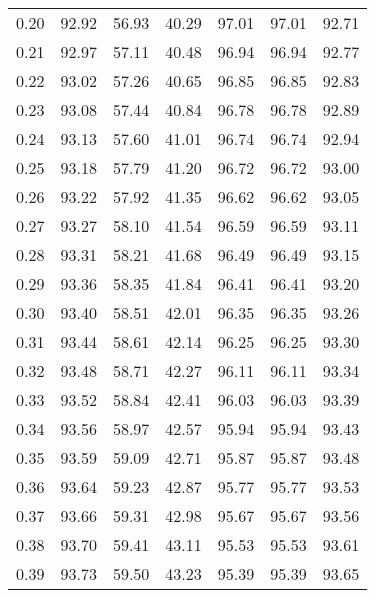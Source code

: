 \begin{tabular}{|c|c|c|c|c|c|c|}
      0.20 &     92.92 &     56.93 &      40.29 &   97.01 &      97.01 &         92.71 \\
      0.21 &     92.97 &     57.11 &      40.48 &   96.94 &      96.94 &         92.77 \\
      0.22 &     93.02 &     57.26 &      40.65 &   96.85 &      96.85 &         92.83 \\
      0.23 &     93.08 &     57.44 &      40.84 &   96.78 &      96.78 &         92.89 \\
      0.24 &     93.13 &     57.60 &      41.01 &   96.74 &      96.74 &         92.94 \\
      0.25 &     93.18 &     57.79 &      41.20 &   96.72 &      96.72 &         93.00 \\
      0.26 &     93.22 &     57.92 &      41.35 &   96.62 &      96.62 &         93.05 \\
      0.27 &     93.27 &     58.10 &      41.54 &   96.59 &      96.59 &         93.11 \\
      0.28 &     93.31 &     58.21 &      41.68 &   96.49 &      96.49 &         93.15 \\
      0.29 &     93.36 &     58.35 &      41.84 &   96.41 &      96.41 &         93.20 \\
      0.30 &     93.40 &     58.51 &      42.01 &   96.35 &      96.35 &         93.26 \\
      0.31 &     93.44 &     58.61 &      42.14 &   96.25 &      96.25 &         93.30 \\
      0.32 &     93.48 &     58.71 &      42.27 &   96.11 &      96.11 &         93.34 \\
      0.33 &     93.52 &     58.84 &      42.41 &   96.03 &      96.03 &         93.39 \\
      0.34 &     93.56 &     58.97 &      42.57 &   95.94 &      95.94 &         93.43 \\
      0.35 &     93.59 &     59.09 &      42.71 &   95.87 &      95.87 &         93.48 \\
      0.36 &     93.64 &     59.23 &      42.87 &   95.77 &      95.77 &         93.53 \\
      0.37 &     93.66 &     59.31 &      42.98 &   95.67 &      95.67 &         93.56 \\
      0.38 &     93.70 &     59.41 &      43.11 &   95.53 &      95.53 &         93.61 \\
      0.39 &     93.73 &     59.50 &      43.23 &   95.39 &      95.39 &         93.65 \\

\end{tabular}
